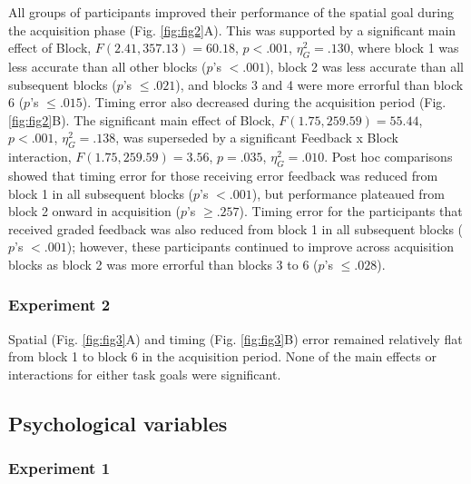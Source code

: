\documentclass[
  doc, donotrepeattitle,floatsintext]{apa7}
\begin{document}
All groups of participants improved their performance of the spatial goal during the acquisition phase (Fig. \ref{fig:fig2}A). This was supported by a significant main effect of Block, \(F(2.41,357.13) = 60.18\), \(p < .001\), \(\eta_{G}^2 = .130\), where block 1 was less accurate than all other blocks (\(p\)'s \(< .001\)), block 2 was less accurate than all subsequent blocks (\(p\)'s \(\leq .021\)), and blocks 3 and 4 were more errorful than block 6 (\(p\)'s \(\leq .015\)). Timing error also decreased during the acquisition period (Fig. \ref{fig:fig2}B). The significant main effect of Block, \(F(1.75,259.59) = 55.44\), \(p < .001\), \(\eta_{G}^2 = .138\), was superseded by a significant Feedback x Block interaction, \(F(1.75, 259.59) = 3.56\), \(p = .035\), \(\eta_{G}^2 = .010\). Post hoc comparisons showed that timing error for those receiving error feedback was reduced from block 1 in all subsequent blocks (\(p\)'s \(< .001\)), but performance plateaued from block 2 onward in acquisition (\(p\)'s \(\geq .257\)). Timing error for the participants that received graded feedback was also reduced from block 1 in all subsequent blocks (\(p\)'s \(< .001\)); however, these participants continued to improve across acquisition blocks as block 2 was more errorful than blocks 3 to 6 (\(p\)'s \(\leq .028\)).

\hypertarget{experiment-2-3}{%
\subsubsection{Experiment 2}\label{experiment-2-3}}

Spatial (Fig. \ref{fig:fig3}A) and timing (Fig. \ref{fig:fig3}B) error remained relatively flat from block 1 to block 6 in the acquisition period. None of the main effects or interactions for either task goals were significant.

\hypertarget{psychological-variables}{%
\subsection{Psychological variables}\label{psychological-variables}}

\hypertarget{experiment-1-4}{%
\subsubsection{Experiment 1}\label{experiment-1-4}}
\end{document}
